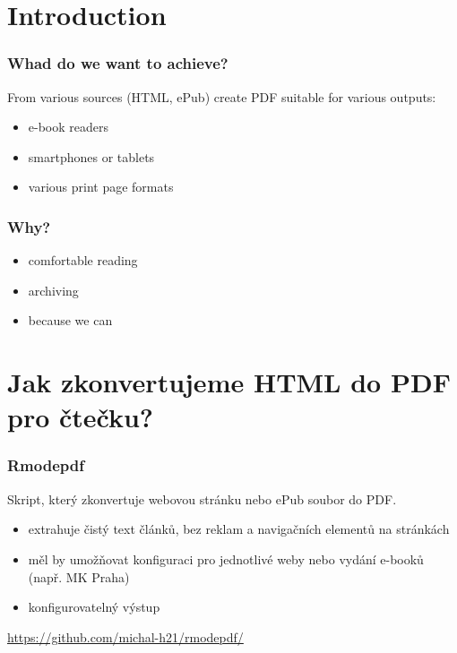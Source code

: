 
\section{Introduction}

\begin{frame}
  \frametitle{Whad do we want to achieve?}
    From various sources (HTML, ePub) create PDF suitable for various outputs:
    \begin{itemize}
      \item e-book readers
      \item smartphones or tablets
      \item various print page formats
    \end{itemize}

  \end{frame}
  \begin{frame}
    \frametitle{Why?}

    \begin{itemize}
      \item comfortable reading
      \item archiving
      \item because we can
    \end{itemize}


\end{frame}

\section{Jak zkonvertujeme HTML do PDF pro čtečku?}

\begin{frame}
  \frametitle{Rmodepdf}

  Skript, který zkonvertuje webovou stránku nebo ePub soubor do PDF.

  \begin{itemize}
    \item extrahuje čistý text článků, bez reklam a navigačních elementů na stránkách
    \item měl by umožňovat konfiguraci pro jednotlivé weby nebo vydání e-booků (např. MK Praha)
    \item konfigurovatelný výstup
  \end{itemize}


    

    \url{https://github.com/michal-h21/rmodepdf/}
  \end{frame}

